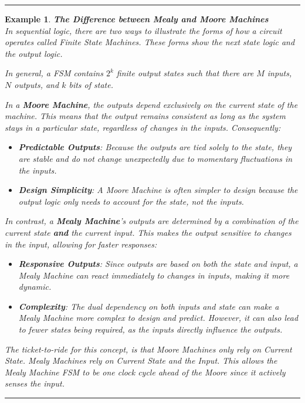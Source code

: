 \documentclass[12pt]{article}
\newtheorem{example}{Example}
\newenvironment{examp}
{
	\vspace{.5cm}
	\hrule
\begin{example}\upshape}
	{\hrule
		\vspace{0.5cm}
\end{example}}
\begin{document}
\begin{examp}
	\vspace{.5cm}
	\textbf{The Difference between Mealy and Moore Machines}\\
	In sequential logic, there are two ways to illustrate the forms of how a circuit
	operates called \textit{Finite State Machines}. These forms show the
	\textit{next state logic} and the \textit{output logic}.

	In general, a FSM contains \(2^k\) \textit{finite} output states such that
	there are \(M\) inputs, \(N\) outputs, and \(k\) bits of state.

	In a \textbf{Moore Machine}, the outputs depend exclusively on the \textit{current state} of the machine. This means that the output remains consistent as long as the system stays in a particular state, regardless of changes in the inputs. Consequently:
	\begin{itemize}
		\item \textbf{Predictable Outputs}: Because the outputs are tied solely to the state, they are stable and do not change unexpectedly due to momentary fluctuations in the inputs.
		\item \textbf{Design Simplicity}: A Moore Machine is often simpler to design because the output logic only needs to account for the state, not the inputs.
	\end{itemize}
	In contrast, a \textbf{Mealy Machine}’s outputs are determined by a combination of the \textit{current state} \textbf{and} the \textit{current input}. This makes the output sensitive to changes in the input, allowing for faster responses:

	\begin{itemize}
		\item \textbf{Responsive Outputs}: Since outputs are based on both the state and input, a Mealy Machine can react immediately to changes in inputs, making it more dynamic.

		\item \textbf{Complexity}: The dual dependency on both inputs and state can make a Mealy Machine more complex to design and predict. However, it can also lead to fewer states being required, as the inputs directly influence the outputs.
	\end{itemize}

	The ticket-to-ride for this concept, is that Moore Machines only rely on
	Current State. Mealy Machines rely on Current State and the Input. This allows
	the Mealy Machine FSM to be one clock cycle ahead of the Moore since it
	actively senses the input.

\end{examp}
\end{document}
